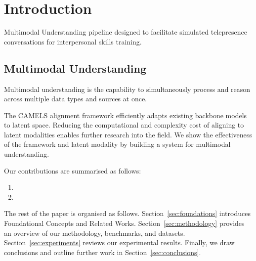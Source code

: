 \documentclass[12pt, a4paper]{article}
\begin{document}
\section{Introduction}

Multimodal Understanding pipeline designed to facilitate simulated telepresence conversations for interpersonal skills training.

\subsection*{Multimodal Understanding}


Multimodal understanding is the capability to simultaneously process and reason across multiple data types and sources at once.


The CAMELS alignment framework efficiently adapts existing backbone models to latent space. Reducing the computational and complexity cost of aligning to latent modalities enables further research into the field. We show the effectiveness of the framework and latent modality by building a system for multimodal understanding.


Our contributions are summarised as follows:
\begin{enumerate}
    \item [Contribution 1 -- TBD]
    \item [Contribution 2 -- TBD]
\end{enumerate}

The rest of the paper is organised as follows. Section~\ref{sec:foundations} introduces Foundational Concepts and Related Works. Section~\ref{sec:methodology} provides an overview of our methodology, benchmarks, and datasets. Section~\ref{sec:experiments} reviews our experimental results. Finally, we draw conclusions and outline further work in Section~\ref{sec:conclusions}.
\end{document}
